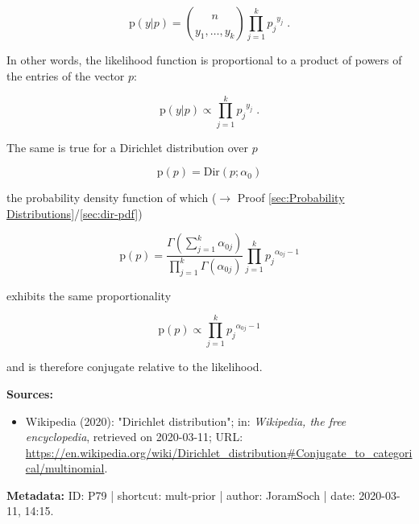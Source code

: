 \documentclass[a4paper,12pt,twoside]{book}
\begin{document}
\begin{equation} \label{eq:mult-prior-Mult-LF}
\mathrm{p}(y|p) = {n \choose {y_1, \ldots, y_k}} \prod_{j=1}^{k} {p_j}^{y_j} \; .
\end{equation}

In other words, the likelihood function is proportional to a product of powers of the entries of the vector $p$:

\begin{equation} \label{eq:mult-prior-Mult-LF-prop}
\mathrm{p}(y|p) \propto \prod_{j=1}^{k} {p_j}^{y_j} \; .
\end{equation}

The same is true for a Dirichlet distribution over $p$

\begin{equation} \label{eq:mult-prior-Mult-prior-s1}
\mathrm{p}(p) = \mathrm{Dir}(p; \alpha_0)
\end{equation}

the probability density function of which ($\rightarrow$ Proof \ref{sec:Probability Distributions}/\ref{sec:dir-pdf})

\begin{equation} \label{eq:mult-prior-Mult-prior-s2}
\mathrm{p}(p) = \frac{\Gamma \left( \sum_{j=1}^{k} \alpha_{0j} \right)}{\prod_{j=1}^k \Gamma(\alpha_{0j})} \prod_{j=1}^{k} {p_j}^{\alpha_{0j}-1}
\end{equation}

exhibits the same proportionality

\begin{equation} \label{eq:mult-prior-Mult-prior-s3}
\mathrm{p}(p) \propto \prod_{j=1}^{k} {p_j}^{\alpha_{0j}-1}
\end{equation}

and is therefore conjugate relative to the likelihood.


\vspace{1em}
\textbf{Sources:}
\begin{itemize}
\item Wikipedia (2020): "Dirichlet distribution"; in: \textit{Wikipedia, the free encyclopedia}, retrieved on 2020-03-11; URL: \url{https://en.wikipedia.org/wiki/Dirichlet_distribution#Conjugate_to_categorical/multinomial}.
\end{itemize}


\vspace{1em}
\textbf{Metadata:} ID: P79 | shortcut: mult-prior | author: JoramSoch | date: 2020-03-11, 14:15.
\vspace{1em}
\end{document}
